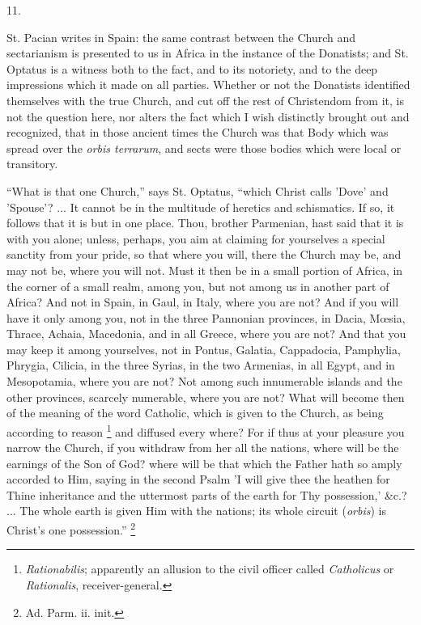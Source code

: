 11.

St. Pacian writes in Spain: the same contrast between
the Church and sectarianism is presented to us in Africa
in the instance of the Donatists; and St. Optatus is a
witness both to the fact, and to its notoriety, and to
the deep impressions which it made on all parties.
Whether or not the Donatists identified themselves with
the true Church, and cut off the rest of Christendom from
it, is not the question here, nor alters the fact which I
wish distinctly brought out and recognized, that in those
ancient times the Church was that Body which was spread
over the \emph{orbis terrarum}, and sects were those
bodies which were local or transitory.

``What is that one Church,'' says St. Optatus,
``which Christ calls 'Dove' and 'Spouse'? ... It
cannot be in the multitude of heretics and schismatics.
If so, it follows that it is but in one place. Thou,
brother Parmenian, hast said that it is with you alone;
unless, perhaps, you aim at claiming for yourselves a
special sanctity from your pride, so that where you will,
there the Church may be, and may not be, where you will
not. Must it then be in a small portion of Africa, in the
corner of a small realm, among you, but not among us in
another part of Africa? And not in Spain, in Gaul, in
Italy, where you are not? And if you will have it only
among you, not in the three Pannonian provinces, in
Dacia, Mœsia, Thrace, Achaia, Macedonia, and in all
Greece, where you are not? And that you may keep it among
yourselves, not in Pontus, Galatia, Cappadocia,
Pamphylia, Phrygia, Cilicia, in the three Syrias, in the
two Armenias, in all Egypt, and in Mesopotamia, where you
are not? Not among such innumerable islands and the other
provinces, scarcely numerable, where you are not? What
will become then of the meaning of the word Catholic,
which is given to the Church, as being according to
reason \footnote{\emph{ Rationabilis}; apparently an
allusion to the civil officer called \emph{ Catholicus} or \emph{
Rationalis}, receiver-general.}
and diffused every where? For if thus at your pleasure
you narrow the Church, if you withdraw from her all the
nations, where will be the earnings of the Son of God?
where will be that which the Father hath so amply
accorded to Him, saying in the second Psalm 'I will give
thee the heathen for Thine inheritance and the uttermost
parts of the earth for Thy possession,' \&c.? ... The
whole earth is given Him with the nations; its whole
circuit (\emph{orbis}) is Christ's one possession.''
\footnote{Ad. Parm. ii. init.}

